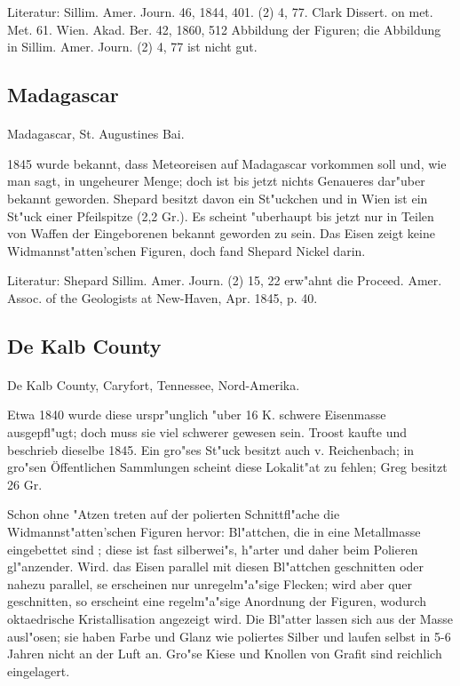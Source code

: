 \documentclass[a4paper, 11pt, oneside]{article}
\begin{document}
Literatur: Sillim. Amer. Journ. 46, 1844, 401. (2) 4, 77. Clark Dissert. on met. Met. 61. Wien. Akad. Ber. 42, 1860, 512 Abbildung der Figuren; die Abbildung in Sillim. Amer. Journ. (2) 4, 77 ist nicht gut.

\subsection{Madagascar}
\normalsize
\paragraph{}
Madagascar, St. Augustines Bai.

1845 wurde bekannt, dass Meteoreisen auf Madagascar vorkommen soll und, wie man sagt, in ungeheurer Menge; doch ist bis jetzt nichts Genaueres dar"uber bekannt geworden. Shepard besitzt davon ein St"uckchen und in Wien ist ein St"uck einer Pfeilspitze (2,2 Gr.). Es scheint "uberhaupt bis jetzt nur in Teilen von Waffen der Eingeborenen bekannt geworden zu sein. Das Eisen zeigt keine Widmannst"atten'schen Figuren, doch fand Shepard Nickel darin.

Literatur: Shepard Sillim. Amer. Journ. (2) 15, 22 erw"ahnt die Proceed. Amer. Assoc. of the Geologists at New-Haven, Apr. 1845, p. 40.

\subsection{De Kalb County}
\normalsize
\paragraph{}
De Kalb County, Caryfort, Tennessee, Nord-Amerika.

Etwa 1840 wurde diese urspr"unglich "uber 16 K. schwere Eisenmasse ausgepfl"ugt; doch muss sie viel schwerer gewesen sein. Troost kaufte und beschrieb dieselbe 1845. Ein gro"ses St"uck besitzt auch v. Reichenbach; in gro"sen Öffentlichen Sammlungen scheint diese Lokalit"at zu fehlen; Greg besitzt 26 Gr.

Schon ohne "Atzen treten auf der polierten Schnittfl"ache die Widmannst"atten'schen Figuren hervor: Bl"attchen, die in eine Metallmasse eingebettet sind ; diese ist fast silberwei"s, h"arter und daher beim Polieren gl"anzender. Wird. das Eisen parallel mit diesen Bl"attchen geschnitten oder nahezu parallel, se erscheinen nur unregelm"a"sige Flecken; wird aber quer geschnitten, so erscheint eine regelm"a"sige Anordnung der Figuren, wodurch oktaedrische Kristallisation angezeigt wird. Die Bl"atter lassen sich aus der Masse ausl"osen; sie haben Farbe und Glanz wie poliertes Silber und laufen selbst in 5-6 Jahren nicht an der Luft an. Gro"se Kiese und Knollen von Grafit sind reichlich eingelagert.
\end{document}
